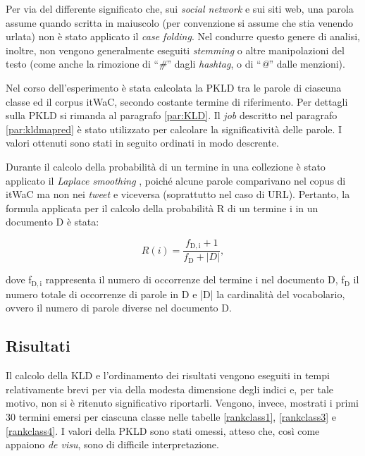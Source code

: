 Per via del differente significato che, sui \textit{social network} e sui siti web, una parola assume quando scritta in maiuscolo (per convenzione si assume che stia venendo urlata) non è 
stato applicato il \textit{case folding}. Nel condurre questo genere di analisi, inoltre, non vengono generalmente eseguiti \textit{stemming} o altre manipolazioni del testo (come anche la 
rimozione di ``\textit{\#}'' dagli \textit{hashtag}, o di ``\textit{@}'' dalle menzioni). 

Nel corso dell'esperimento è stata calcolata la PKLD tra le parole di ciascuna classe ed il corpus itWaC, secondo costante termine di riferimento. Per dettagli sulla PKLD si rimanda al paragrafo
\ref{par:KLD}. Il \textit{job} descritto nel paragrafo \ref{par:kldmapred} è stato utilizzato per calcolare la significatività delle parole. I valori ottenuti sono stati in seguito ordinati in 
modo descrente.

Durante il calcolo della probabilità di un termine in una collezione è stato applicato il \textit{Laplace smoothing} \cite{irlaplace}, poiché alcune parole comparivano nel 
copus di itWaC ma non nei \textit{tweet} e viceversa (soprattutto nel caso di URL). Pertanto, la formula applicata per il calcolo della probabilità R di un termine i in un documento D è stata:

\begin{equation} \label{eq:laplace}
R(i) = \frac{f_{\mathrm{D,i}} + 1}{f_{\mathrm{D}} + |D|},
\end{equation}

dove f$_{\mathrm{D,i}}$ rappresenta il numero di occorrenze del termine i nel documento D, f$_{\mathrm{D}}$ il numero totale di occorrenze di parole in D e |D| la cardinalità del vocabolario,
ovvero il numero di parole diverse nel documento D.

\subsection{Risultati}

Il calcolo della KLD e l'ordinamento dei risultati vengono eseguiti in tempi relativamente brevi per via della modesta dimensione degli indici e, per tale motivo, non si è ritenuto significativo riportarli.
Vengono, invece, mostrati i primi 30 termini emersi per ciascuna classe nelle tabelle \ref{rankclass1}, \ref{rankclass3} e \ref{rankclass4}.
I valori della PKLD sono stati omessi, atteso che, così come appaiono \textit{de visu}, sono di difficile interpretazione. 

